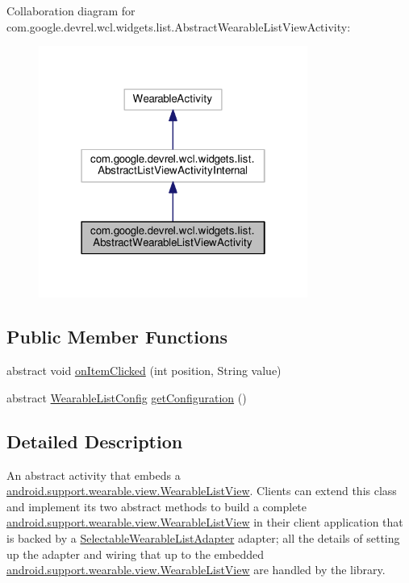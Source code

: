 Collaboration diagram for com.\+google.\+devrel.\+wcl.\+widgets.\+list.\+Abstract\+Wearable\+List\+View\+Activity\+:
\nopagebreak
\begin{figure}[H]
\begin{center}
\leavevmode
\includegraphics[width=250pt]{da/d0a/classcom_1_1google_1_1devrel_1_1wcl_1_1widgets_1_1list_1_1AbstractWearableListViewActivity__coll__graph}
\end{center}
\end{figure}
\subsection*{Public Member Functions}
\begin{DoxyCompactItemize}
\item 
abstract void \hyperlink{classcom_1_1google_1_1devrel_1_1wcl_1_1widgets_1_1list_1_1AbstractWearableListViewActivity_a2846ac8d8bf01ce575387a9d6598e2c7}{on\+Item\+Clicked} (int position, String value)
\item 
abstract \hyperlink{classcom_1_1google_1_1devrel_1_1wcl_1_1widgets_1_1list_1_1WearableListConfig}{Wearable\+List\+Config} \hyperlink{classcom_1_1google_1_1devrel_1_1wcl_1_1widgets_1_1list_1_1AbstractWearableListViewActivity_a5b8d193250e103755ce1071721885059}{get\+Configuration} ()
\end{DoxyCompactItemize}


\subsection{Detailed Description}
An abstract activity that embeds a \hyperlink{}{android.\+support.\+wearable.\+view.\+Wearable\+List\+View}. Clients can extend this class and implement its two abstract methods to build a complete \hyperlink{}{android.\+support.\+wearable.\+view.\+Wearable\+List\+View} in their client application that is backed by a \hyperlink{classcom_1_1google_1_1devrel_1_1wcl_1_1widgets_1_1list_1_1SelectableWearableListAdapter}{Selectable\+Wearable\+List\+Adapter} adapter; all the details of setting up the adapter and wiring that up to the embedded \hyperlink{}{android.\+support.\+wearable.\+view.\+Wearable\+List\+View} are handled by the library.

